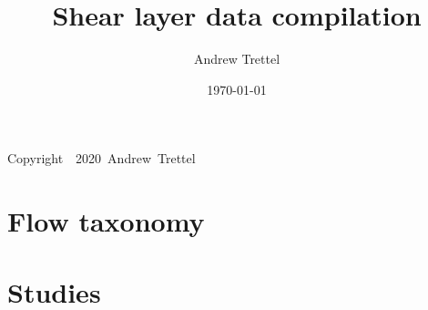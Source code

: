 \documentclass[12pt,oneside]{book}
\title{Shear layer data compilation}
\date{\today}
\author{Andrew Trettel}
\begin{document}
\frontmatter
\maketitle

\clearpage\null\vfill
\pagestyle{empty}
\begin{center}
Copyright~\textcopyright~2020~Andrew~Trettel
\end{center}

\tableofcontents

\mainmatter

\chapter{Flow taxonomy}



\chapter{Studies}
\end{document}
